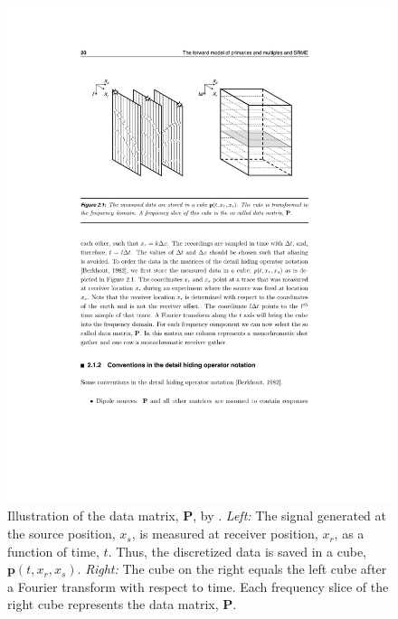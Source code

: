 \begin{figure}
    \centering
	\includegraphics{Plots/P-Groenestijn_2010}
	\caption{Illustration of the data matrix, $\mathbf{P}$, by \citet{Groenestijn_2010}. \textit{Left:} The signal generated at the source position, $x_s$, is measured at receiver position, $x_r$, as a function of time, $t$. Thus, the discretized data is saved in a cube, $\mathbf{p}(t,x_r,x_s)$. \textit{Right:} The cube on the right equals the left cube after a Fourier transform with respect to time. Each frequency slice of the right cube represents the data matrix, $\mathbf{P}$.}
	\label{fig:Ch-Theory-DataMatrix}
\end{figure}


